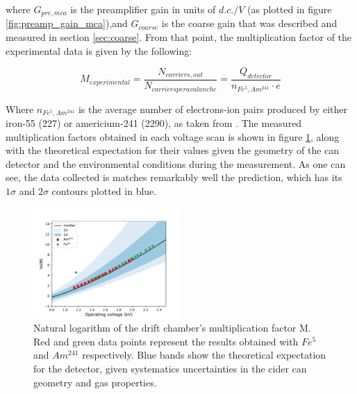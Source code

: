 where $G_{pre,mca}$ is the preamplifier gain in units of $d.c./V$ (as plotted in figure \ref{fig:preamp_gain_mca}),and $G_{coarse}$ is the coarse gain that was described and measured in section \ref{sec:coarse}. From that point, the multiplication factor of the experimental data is given by the following:

\begin{equation}
  M_{experimental} = \frac{N_{carriers,out}}{N_{carriers per avalanche}} = \frac{Q_{detector}}{n_{Fe^{5},Am^{241}}\cdot e}
\end{equation}

Where $n_{Fe^{5},Am^{241}}$ is the average number of electrons-ion pairs produced by either iron-55 (227) or americium-241 (2290), as taken from \cite{can_paper}. The measured multiplication factors obtained in each voltage scan is shown in figure \ref{final_lnm}, along with the theoretical expectation for their values given the geometry of the can detector and the environmental conditions during the measurement. As one can see, the data collected is matches remarkably well the prediction, which has its $1\sigma$ and $2\sigma$ contours plotted in blue.

\begin{figure}[htb!]
  \includegraphics[width=0.5\textwidth]{graphics/lnM_final_plot.pdf}
  \caption{Natural logarithm of the drift chamber's multiplication factor M. Red and green data points represent the results obtained with $Fe^{5}$ and $Am^{241}$ respectively. Blue bands show the theoretical expectation for the detector, given systematics uncertainties in the cider can geometry and gas properties.}
  \label{final_lnm}
\end{figure}

